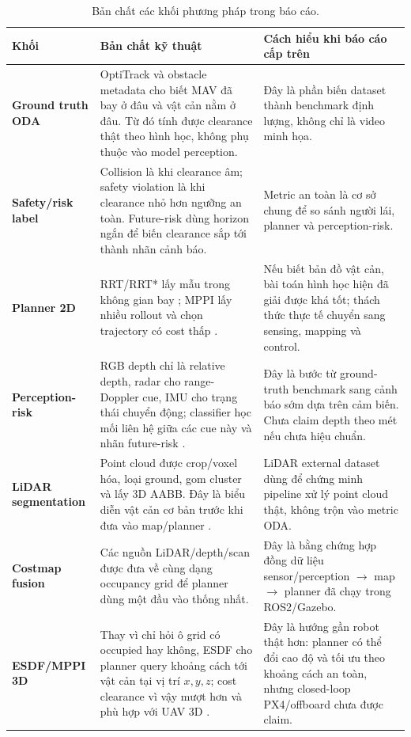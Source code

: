 \documentclass[10pt,a4paper]{article}
\begin{document}
\begin{table}[H]
\centering
\small
\caption{Bản chất các khối phương pháp trong báo cáo.}
\begin{tabularx}{0.98\linewidth}{>{\bfseries}p{3.1cm} X X}
\toprule
Khối & Bản chất kỹ thuật & Cách hiểu khi báo cáo cấp trên \\
\midrule
Ground truth ODA & OptiTrack và obstacle metadata cho biết MAV đã bay ở đâu và vật cản nằm ở đâu. Từ đó tính được clearance thật theo hình học, không phụ thuộc vào model perception. & Đây là phần biến dataset thành benchmark định lượng, không chỉ là video minh họa. \\
Safety/risk label & Collision là khi clearance âm; safety violation là khi clearance nhỏ hơn ngưỡng an toàn. Future-risk dùng horizon ngắn để biến clearance sắp tới thành nhãn cảnh báo. & Metric an toàn là cơ sở chung để so sánh người lái, planner và perception-risk. \\
Planner 2D & RRT/RRT* lấy mẫu trong không gian bay \cite{rrt,rrtstar}; MPPI lấy nhiều rollout và chọn trajectory có cost thấp \cite{mppi}. & Nếu biết bản đồ vật cản, bài toán hình học hiện đã giải được khá tốt; thách thức thực tế chuyển sang sensing, mapping và control. \\
Perception-risk & RGB depth chỉ là relative depth, radar cho range-Doppler cue, IMU cho trạng thái chuyển động; classifier học mối liên hệ giữa các cue này và nhãn future-risk \cite{depthAnythingV2,tiRadar}. & Đây là bước từ ground-truth benchmark sang cảnh báo sớm dựa trên cảm biến. Chưa claim depth theo mét nếu chưa hiệu chuẩn. \\
LiDAR segmentation & Point cloud được crop/voxel hóa, loại ground, gom cluster và lấy 3D AABB. Đây là biểu diễn vật cản cơ bản trước khi đưa vào map/planner \cite{pclVoxel,pclCluster}. & LiDAR external dataset dùng để chứng minh pipeline xử lý point cloud thật, không trộn vào metric ODA. \\
Costmap fusion & Các nguồn LiDAR/depth/scan được đưa về cùng dạng occupancy grid để planner dùng một đầu vào thống nhất. & Đây là bằng chứng hợp đồng dữ liệu sensor/perception \(\rightarrow\) map \(\rightarrow\) planner đã chạy trong ROS2/Gazebo. \\
ESDF/MPPI 3D & Thay vì chỉ hỏi ô grid có occupied hay không, ESDF cho planner query khoảng cách tới vật cản tại vị trí \(x,y,z\); cost clearance vì vậy mượt hơn và phù hợp với UAV 3D \cite{voxblox,nvblox}. & Đây là hướng gần robot thật hơn: planner có thể đổi cao độ và tối ưu theo khoảng cách an toàn, nhưng closed-loop PX4/offboard chưa được claim. \\
\bottomrule
\end{tabularx}
\end{table}
\end{document}
